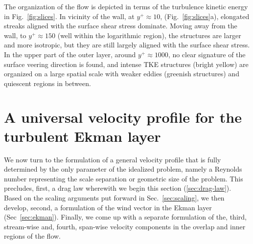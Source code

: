 \documentclass[smallcondensed,final]{svjour3}
\begin{document}
The organization of the flow is depicted in terms of the turbulence kinetic energy in Fig.~\ref{fig:slices}.
%
In vicinity of the wall, at $y^+\approx 10$, (Fig.~\ref{fig:slices}a), elongated streaks aligned with the
surface shear stress dominate.
%
Moving away from the wall, to $y^+\approx 150$ (well within the logarithmic region), the structures
are larger and more isotropic, but they are still largely aligned with the surface shear stress.
%
In the upper part of the outer layer, around $y^+\approx 1000$, no clear signature of the
surface veering direction is found, and intense TKE structures (bright yellow)
are organized on a large spatial scale with weaker eddies (greenish structures) and quiescent regions
in between.  

\section{A universal velocity profile for the turbulent Ekman layer}
\label{sec:profiles} 
%
We now turn to the formulation of a general velocity profile that is fully determined by the only
parameter of the idealized problem, namely a Reynolds number representing the scale separation or
geometric size of the problem.
%
This precludes, first, a drag law wherewith we begin this section (\ref{sec:drag-law}).
Based on the scaling arguments put forward in Sec.~\ref{sec:scaling}, we then develop, second,
a formulation of the wind vector in the Ekman layer (Sec~\ref{sec:ekman}). Finally, we come up
with a separate formulation of the, third, stream-wise and, fourth, span-wise velocity components in the
overlap and inner regions of the flow. 
%
% 
\end{document}
